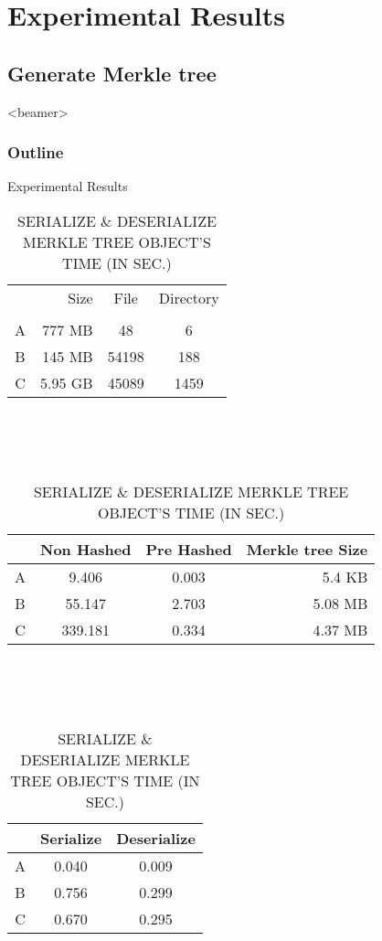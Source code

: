 \section{Experimental Results}

\subsection{Generate Merkle tree}
\begin{frame}<beamer>
    \frametitle{Outline}
    \tableofcontents[currentsubsection]
\end{frame}

\begin{frame}{Experimental Results}
	\begin{table}[]
		\scriptsize
		\centering
		\begin{tabular}{crcc}
			  & Size    & File  & Directory \\
			  &			&		&		    \\
			A & 777 MB  & 48    & 6         \\
			B & 145 MB  & 54198 & 188       \\
			C & 5.95 GB & 45089 & 1459      \\
		\end{tabular}
        ~\\
        ~\\
        ~\\
		\caption{GENERATE MERKLE TREE'S TIME (IN SEC.)}
		\begin{tabular}{|c|c|c|r|}
			\hline
              & Non Hashed & Pre Hashed & Merkle tree Size \\ \hline
            A & 9.406    & 0.003    & 5.4 KB           \\ \hline
            B & 55.147   & 2.703    & 5.08 MB          \\ \hline
            C & 339.181  & 0.334    & 4.37 MB          \\ \hline
		\end{tabular}
        ~\\
        ~\\
        ~\\
        \caption{SERIALIZE \& DESERIALIZE MERKLE TREE OBJECT'S TIME (IN SEC.)}
		\begin{tabular}{|c|c|c|}
            \hline
              & Serialize & Deserialize \\ \hline
            A & 0.040      & 0.009       \\ \hline
            B & 0.756      & 0.299       \\ \hline
            C & 0.670      & 0.295       \\ \hline
		\end{tabular}
	\end{table}
\end{frame}


